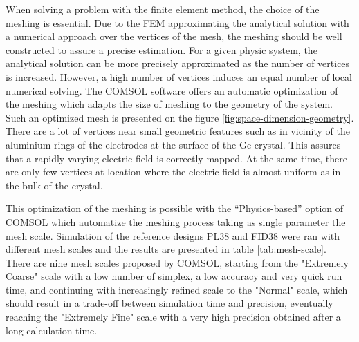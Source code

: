 When solving a problem with the finite element method, the choice of the meshing is essential. Due to the FEM approximating the analytical solution with a numerical approach over the vertices of the mesh, the meshing should be well constructed to assure a precise estimation. For a given physic system, the analytical solution can be more precisely approximated as the number of vertices is increased. However, a high number of vertices induces an equal number of local numerical solving. The COMSOL software offers an automatic optimization of the meshing which adapts the size of meshing to the geometry of the system. Such an optimized mesh is presented on the figure \ref{fig:space-dimension-geometry}. There are a lot of vertices near small geometric features such as in vicinity of the aluminium rings of the electrodes at the surface of the Ge crystal. This assures that a rapidly varying electric field is correctly mapped. At the same time, there are only few vertices at location where the electric field is almost uniform as in the bulk of the crystal.

This optimization of the meshing is possible with the “Physics-based” option of COMSOL which automatize the meshing process taking as single parameter the mesh scale. Simulation of the reference designs PL38 and FID38 were ran with different mesh scales and the results are presented in table \ref{tab:mesh-scale}. There are nine mesh scales proposed by COMSOL, starting from the "Extremely Coarse" scale with a low number of simplex, a low accuracy and very quick run time, and continuing with increasingly refined scale to the "Normal" scale, which should result in a trade-off between simulation time and precision, eventually reaching the "Extremely Fine" scale with a very high precision obtained after a long calculation time. 

